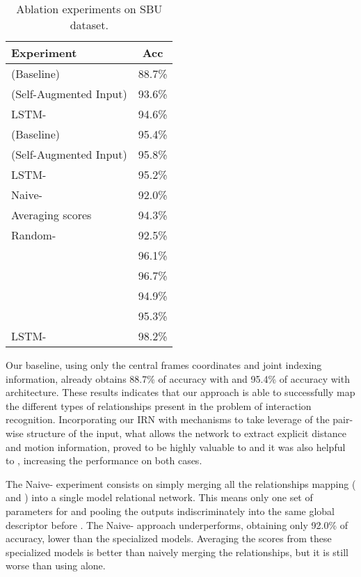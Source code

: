 \documentclass[journal,twoside]{IEEEtran}
\renewcommand{\arraystretch}{1.2}
\begin{document}
\begin{table}[ht]
	\begin{center}
	\setlength{\tabcolsep}{2em}
	\renewcommand{\arraystretch}{1.4} \caption{Ablation experiments on SBU dataset.}
	\begin{tabular}{lc}
		\toprule
		\textbf{Experiment} 						& \textbf{Acc} \\ \midrule
		 (Baseline)					& 88.7\%			\\ 
		 (Self-Augmented Input)	& 93.6\%			\\ 
		LSTM-						& 94.6\%			\\ \midrule
		
		 (Baseline)					& 95.4\%			\\ 
		 (Self-Augmented Input)	& 95.8\%			\\ 
		LSTM-						& 95.2\%			\\ \midrule
		
		Naive-		        & 92.0\%	\\ 
		Averaging scores                            & 94.3\%	\\ 
		Random-	            & 92.5\%	\\ 
		                     & 96.1\%	\\ 
				        	& 96.7\%	\\ 
				            & 94.9\%	\\ 
				            & 95.3\%	\\ 
		LSTM-	            & 98.2\%	\\ \bottomrule
	\end{tabular}
	\label{tab:sbu_results}
	\end{center}
\end{table}



Our baseline, using only the central frames coordinates and joint indexing information, already obtains 88.7\% of accuracy with  and 95.4\% of accuracy with  architecture. These results indicates that our approach is able to successfully map the different types of relationships present in the problem of interaction recognition.
Incorporating our IRN with mechanisms to take leverage of the pair-wise structure of the input, what allows the network to extract explicit distance and motion information, proved to be highly valuable to  and it was also helpful to , increasing the performance on both cases.

The Naive- experiment consists on simply merging all the relationships mapping ( and ) into a single model relational network. 
This means only one set of parameters for  and pooling the outputs indiscriminately into the same global descriptor before . 
The Naive- approach underperforms, obtaining only 92.0\% of accuracy, lower than the specialized  models.
Averaging the scores from these specialized models is better than naively merging the relationships, but it is still worse than using  alone.
\end{document}
